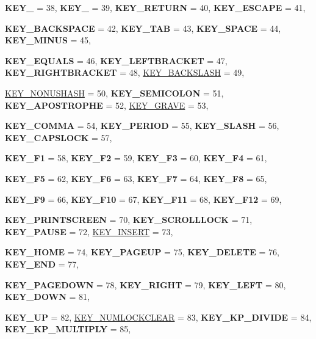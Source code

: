 \begin{DoxyCompactItemize}
{\bfseries KEY\_} =  38, 
{\bfseries KEY\_} =  39, 
{\bfseries KEY\_\-RETURN} =  40, 
{\bfseries KEY\_\-ESCAPE} =  41, 
\par
{\bfseries KEY\_\-BACKSPACE} =  42, 
{\bfseries KEY\_\-TAB} =  43, 
{\bfseries KEY\_\-SPACE} =  44, 
{\bfseries KEY\_\-MINUS} =  45, 
\par
{\bfseries KEY\_\-EQUALS} =  46, 
{\bfseries KEY\_\-LEFTBRACKET} =  47, 
{\bfseries KEY\_\-RIGHTBRACKET} =  48, 
\hyperlink{classphys_1_1MetaCode_a3e501cbb5bf0f6f1fdb7211465bda8d8acab0c272975d1667521cd5ae918e9b8e}{KEY\_\-BACKSLASH} =  49, 
\par
\hyperlink{classphys_1_1MetaCode_a3e501cbb5bf0f6f1fdb7211465bda8d8afd23349e045ee52f42e1c5c25ee3cec3}{KEY\_\-NONUSHASH} =  50, 
{\bfseries KEY\_\-SEMICOLON} =  51, 
{\bfseries KEY\_\-APOSTROPHE} =  52, 
\hyperlink{classphys_1_1MetaCode_a3e501cbb5bf0f6f1fdb7211465bda8d8a1961eccca163bf3ceb9e6dea3c23375c}{KEY\_\-GRAVE} =  53, 
\par
{\bfseries KEY\_\-COMMA} =  54, 
{\bfseries KEY\_\-PERIOD} =  55, 
{\bfseries KEY\_\-SLASH} =  56, 
{\bfseries KEY\_\-CAPSLOCK} =  57, 
\par
{\bfseries KEY\_\-F1} =  58, 
{\bfseries KEY\_\-F2} =  59, 
{\bfseries KEY\_\-F3} =  60, 
{\bfseries KEY\_\-F4} =  61, 
\par
{\bfseries KEY\_\-F5} =  62, 
{\bfseries KEY\_\-F6} =  63, 
{\bfseries KEY\_\-F7} =  64, 
{\bfseries KEY\_\-F8} =  65, 
\par
{\bfseries KEY\_\-F9} =  66, 
{\bfseries KEY\_\-F10} =  67, 
{\bfseries KEY\_\-F11} =  68, 
{\bfseries KEY\_\-F12} =  69, 
\par
{\bfseries KEY\_\-PRINTSCREEN} =  70, 
{\bfseries KEY\_\-SCROLLLOCK} =  71, 
{\bfseries KEY\_\-PAUSE} =  72, 
\hyperlink{classphys_1_1MetaCode_a3e501cbb5bf0f6f1fdb7211465bda8d8a708ea6204b1cc2ed7756989b8d850ce6}{KEY\_\-INSERT} =  73, 
\par
{\bfseries KEY\_\-HOME} =  74, 
{\bfseries KEY\_\-PAGEUP} =  75, 
{\bfseries KEY\_\-DELETE} =  76, 
{\bfseries KEY\_\-END} =  77, 
\par
{\bfseries KEY\_\-PAGEDOWN} =  78, 
{\bfseries KEY\_\-RIGHT} =  79, 
{\bfseries KEY\_\-LEFT} =  80, 
{\bfseries KEY\_\-DOWN} =  81, 
\par
{\bfseries KEY\_\-UP} =  82, 
\hyperlink{classphys_1_1MetaCode_a3e501cbb5bf0f6f1fdb7211465bda8d8a7cd4a721f5b2be2cc13856a46199508a}{KEY\_\-NUMLOCKCLEAR} =  83, 
{\bfseries KEY\_\-KP\_\-DIVIDE} =  84, 
{\bfseries KEY\_\-KP\_\-MULTIPLY} =  85, 
\par

\end{DoxyCompactItemize}
